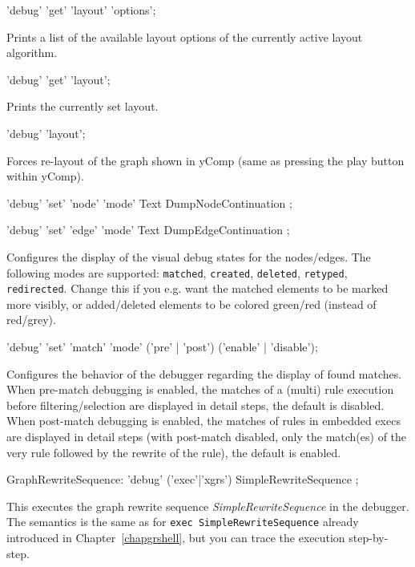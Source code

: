 \begin{rail}
  'debug' 'get' 'layout' 'options';
\end{rail}
Prints a list of the available layout options of the currently active layout algorithm.

\begin{rail}
  'debug' 'get' 'layout';
\end{rail}
Prints the currently set layout.

\begin{rail}
  'debug' 'layout';
\end{rail}
Forces re-layout of the graph shown in yComp (same as pressing the play button within yComp).

\begin{rail}
  'debug' 'set' 'node' 'mode' Text DumpNodeContinuation ;
\end{rail}
\begin{rail}
  'debug' 'set' 'edge' 'mode' Text DumpEdgeContinuation ;
\end{rail}
Configures the display of the visual debug states for the nodes/edges.
The following modes are supported: \texttt{matched}, \texttt{created}, \texttt{deleted}, \texttt{retyped}, \texttt{redirected}.
Change this if you e.g. want the matched elements to be marked more visibly, or added/deleted elements to be colored green/red (instead of red/grey).

\pagebreak

\begin{rail}
  'debug' 'set' 'match' 'mode' ('pre' | 'post') ('enable' | 'disable');
\end{rail}
Configures the behavior of the debugger regarding the display of found matches.
When pre-match debugging is enabled, the matches of a (multi) rule execution before filtering/selection are displayed in detail steps, the default is disabled.
When post-match debugging is enabled, the matches of rules in embedded execs are displayed in detail steps
(with post-match disabled, only the match(es) of the very rule followed by the rewrite of the rule), the default is enabled.

\begin{rail}
  GraphRewriteSequence: 'debug' ('exec'|'xgrs') SimpleRewriteSequence ;
\end{rail}
This executes the graph rewrite sequence \emph{SimpleRewriteSequence} in the debugger.
The semantics is the same as for \texttt{exec SimpleRewriteSequence} already introduced in Chapter~\ref{chapgrshell}, but you can trace the execution step-by-step.

